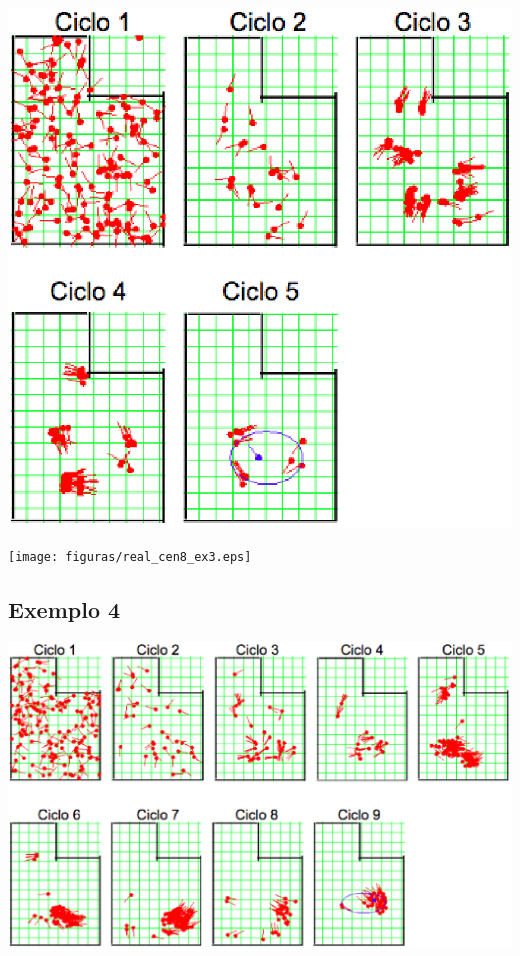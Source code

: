 {\centering
\includegraphics[scale=0.4]{figuras/cen8_ex3.eps}
\label{img:cen8_ex3}
\par}

{\centering
\texttt{[image: figuras/real\_cen8\_ex3.eps]}
\label{img:real_cen8_ex3}
\par}

\subsection{Exemplo 4}

{\centering
\includegraphics[scale=0.4]{figuras/cen8_ex4.eps}
\label{img:cen8_ex4}
\par}

